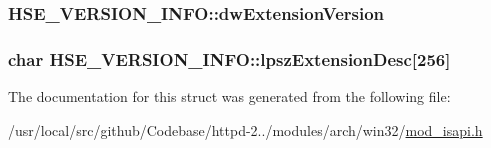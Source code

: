 \subsubsection[{\texorpdfstring{dw\+Extension\+Version}{dwExtensionVersion}}]{ H\+S\+E\+\_\+\+V\+E\+R\+S\+I\+O\+N\+\_\+\+I\+N\+F\+O\+::dw\+Extension\+Version}\hypertarget{structHSE__VERSION__INFO_a766fbc302690e65e854f2f5379d3c6b1}{}\label{structHSE__VERSION__INFO_a766fbc302690e65e854f2f5379d3c6b1}
\subsubsection[{\texorpdfstring{lpsz\+Extension\+Desc}{lpszExtensionDesc}}]{\setlength{\rightskip}{0pt plus 5cm}char H\+S\+E\+\_\+\+V\+E\+R\+S\+I\+O\+N\+\_\+\+I\+N\+F\+O\+::lpsz\+Extension\+Desc\mbox{[}256\mbox{]}}\hypertarget{structHSE__VERSION__INFO_a75caa7d1ad5473e0a33f80e96b9b62ab}{}\label{structHSE__VERSION__INFO_a75caa7d1ad5473e0a33f80e96b9b62ab}


The documentation for this struct was generated from the following file\+:\begin{DoxyCompactItemize}
\item 
/usr/local/src/github/\+Codebase/httpd-\/2../modules/arch/win32/\hyperlink{mod__isapi_8h}{mod\+\_\+isapi.\+h}\end{DoxyCompactItemize}
